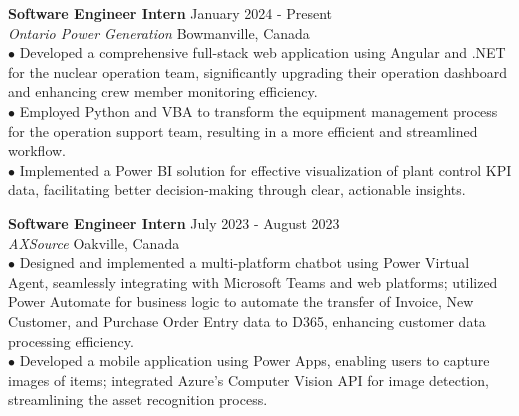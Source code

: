 \documentclass[letterpaper,12pt]{article}
\begin{document}
\textbf{Software Engineer Intern} \hfill January 2024 - Present \\
\textit{Ontario Power Generation} \hfill Bowmanville, Canada
\vspace{0.25cm} \\
\hspace{0.1cm} $\bullet$ \hspace{0.21em}Developed a comprehensive full-stack web application using Angular and .NET for the nuclear operation team, significantly upgrading their operation dashboard and enhancing crew member monitoring efficiency.\\ 
\hspace{0.1cm} $\bullet$ \hspace{0.35em}Employed Python and VBA to transform the equipment management process for the operation support team, resulting in a more efficient and streamlined workflow.\\
\hspace{0.1cm} $\bullet$ \hspace{0.35em}Implemented a Power BI solution for effective visualization of plant control KPI data, facilitating better decision-making through clear, actionable insights.

\textbf{Software Engineer Intern}  \hfill   July 2023 - August 2023 \\
\textit{AXSource} \hfill Oakville, Canada
\vspace{0.3cm}  
\\\hspace{0.1cm} $\bullet$ \hspace{0.3em}Designed and implemented a multi-platform chatbot using Power Virtual Agent, seamlessly integrating with Microsoft Teams and web platforms; utilized Power Automate for business logic to automate the transfer of Invoice, New Customer, and Purchase Order Entry data to D365, enhancing customer data processing efficiency.\\
\hspace{0.1cm} $\bullet$ \hspace{0.35em}Developed a mobile application using Power Apps, enabling users to capture images of items; integrated Azure's Computer Vision API for image detection, streamlining the asset recognition process. 
\end{document}
